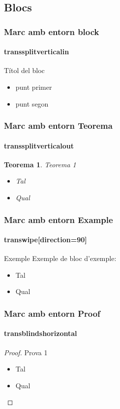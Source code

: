 \documentclass[12pt]{beamer}
\newtheorem{teorema}[theorem]{Teorema}
\begin{document}
\subsection{Blocs}
\begin{frame}
  \frametitle{Marc amb entorn block}
  \framesubtitle{transsplitverticalin}
  \begin{block}{Títol del bloc}
				\begin{itemize}
					\item punt primer
					\item punt segon
				\end{itemize}
	\end{block} 

	\transsplitverticalin
	
\end{frame}
\begin{frame}
  \frametitle{Marc amb entorn Teorema}
  \framesubtitle{transsplitverticalout}
  \begin{teorema}{Teorema 1}
				\begin{itemize}
					\item Tal
					\item Qual
				\end{itemize}
\end{teorema} 
 	\transsplitverticalout
	

\end{frame}
\begin{frame}
  \frametitle{Marc amb entorn Example}
  \framesubtitle{transwipe[direction=90]}

\begin{exampleblock}{Exemple}
Exemple de bloc d'exemple:
   \begin{itemize}
	\item Tal
	\item Qual
   \end{itemize}
\end{exampleblock}

\transwipe[direction=90]

\end{frame}
\begin{frame}
  \frametitle{Marc amb entorn Proof}
    \framesubtitle{transblindshorizontal}

  \begin{proof}{Prova 1}
				\begin{itemize}
					\item Tal
					\item Qual
				\end{itemize}
\end{proof} 
\transblindshorizontal
\end{frame}
\end{document}
